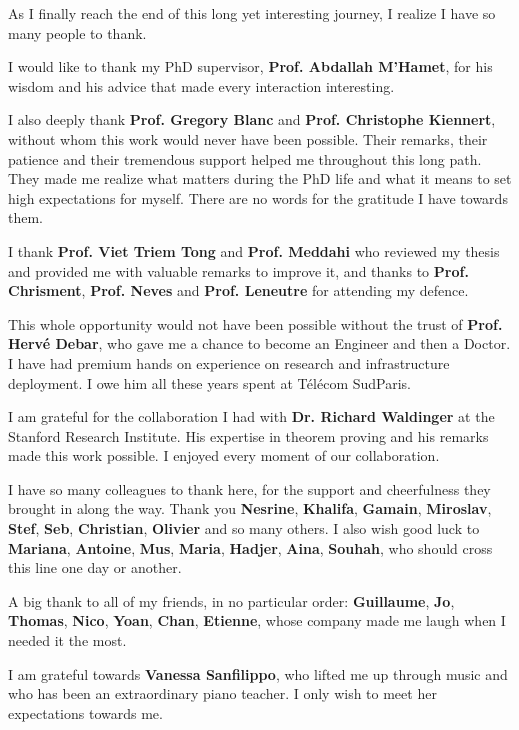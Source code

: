 \documentclass[a4paper, 11pt]{report}
\theoremstyle{definition}
\begin{document}
As I finally reach the end of this long yet interesting journey, I realize I have so many people to thank.

I would like to thank my PhD supervisor, \textbf{Prof. Abdallah M'Hamet}, for his wisdom and his advice that made every interaction interesting.

I also deeply thank \textbf{Prof. Gregory Blanc} and \textbf{Prof. Christophe Kiennert}, without whom this work 
would never have been possible. Their remarks, their patience and their tremendous support helped me throughout this long path. They made me realize what matters during the PhD life and what it means to set high expectations for myself. There are no words for the gratitude I have towards them.

I thank \textbf{Prof. Viet Triem Tong} and \textbf{Prof. Meddahi} who reviewed my thesis and provided me with valuable remarks to improve it, and thanks to \textbf{Prof. Chrisment}, \textbf{Prof. Neves} and \textbf{Prof. Leneutre} for attending my defence.

This whole opportunity would not have been possible without the trust of \textbf{Prof. Herv\'e Debar}, who gave me a chance to become an Engineer and then a Doctor. I have had premium hands on experience on research and infrastructure deployment. I owe him all these years spent at T\'el\'ecom SudParis.

I am grateful for the collaboration I had with \textbf{Dr. Richard Waldinger} at the Stanford Research Institute. His expertise in theorem proving and his remarks made this work possible. I enjoyed every moment of our collaboration.

I have so many colleagues to thank here, for the support and cheerfulness they brought in along the way.
Thank you \textbf{Nesrine}, \textbf{Khalifa}, \textbf{Gamain}, \textbf{Miroslav}, \textbf{Stef}, \textbf{Seb}, \textbf{Christian}, \textbf{Olivier} and so many others. I also wish good luck to \textbf{Mariana}, \textbf{Antoine}, \textbf{Mus}, \textbf{Maria}, \textbf{Hadjer}, \textbf{Aina}, \textbf{Souhah}, who should cross this line one day or another.

A big thank to all of my friends, in no particular order: \textbf{Guillaume}, \textbf{Jo}, \textbf{Thomas}, \textbf{Nico}, \textbf{Yoan}, \textbf{Chan}, \textbf{Etienne}, whose company made me laugh when I needed it the most. 

I am grateful towards \textbf{Vanessa Sanfilippo}, who lifted me up through music and who has been an extraordinary piano teacher. I only wish to meet her expectations towards me.
\end{document}
